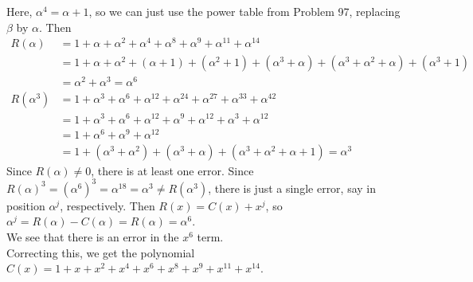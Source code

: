 \documentclass[11pt]{article}
\begin{document}
\medskip
{}
Here, $\alpha^4 = \alpha+1$, so we can just use the power table from Problem 97,
replacing $\beta$ by $\alpha$.
Then
\begin{align*}
     R(\alpha)
  &= 1 + \alpha + \alpha^2 +  \alpha^4  +  \alpha^8    +  \alpha^9         + \alpha^{11}                + \alpha^{14}\\
  &= 1 + \alpha + \alpha^2 + (\alpha+1) + (\alpha^2+1) + (\alpha^3+\alpha) + (\alpha^3+\alpha^2+\alpha) + (\alpha^3+1)\\
  &= \alpha^2 + \alpha^3
   = \alpha^6\\
     R(\alpha^3)
  &= 1 + \alpha^3 + \alpha^6 + \alpha^{12} + \alpha^{24} + \alpha^{27} + \alpha^{33} + \alpha^{42}\\
  &= 1 + \alpha^3 + \alpha^6 + \alpha^{12} + \alpha^9    + \alpha^{12} + \alpha^3    + \alpha^{12}\\
  &= 1 + \alpha^6 + \alpha^9 + \alpha^{12} \\
  &= 1 + (\alpha^3+\alpha^2) + (\alpha^3+\alpha) + (\alpha^3+\alpha^2+\alpha+1)
   = \alpha^3
\end{align*}
Since $R(\alpha) \neq 0$, there is at least one error.
Since $R(\alpha)^3 = (\alpha^6)^3 = \alpha^{18} = \alpha^3 \neq R(\alpha^3)$,
there is just a single error, say in position $\alpha^j$, respectively.
Then $R(x) = C(x) + x^j$, so $\alpha^j = R(\alpha) - C(\alpha) = R(\alpha) = \alpha^6$.\\
We see that there is an error in the $x^6$ term.\\
Correcting this, we get the polynomial
$C(x) = 1 + x + x^2 + x^4 + x^6 + x^8 + x^9 + x^{11} + x^{14}$.
\end{document}
